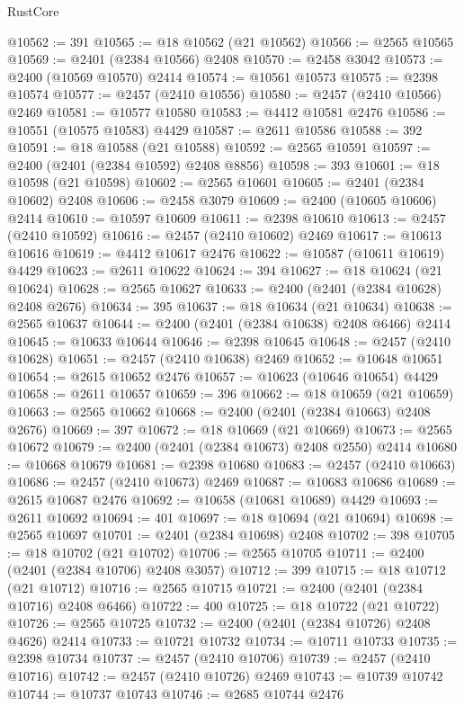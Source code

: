 \begin{lexlean}{RustCore}
\begin{coremodule}
@10562 := 391
@10565 := @18 @10562 (@21 @10562)
@10566 := @2565 @10565
@10569 := @2401 (@2384 @10566) @2408
@10570 := @2458 @3042
@10573 := @2400 (@10569 @10570) @2414
@10574 := @10561 @10573
@10575 := @2398 @10574
@10577 := @2457 (@2410 @10556)
@10580 := @2457 (@2410 @10566) @2469
@10581 := @10577 @10580
@10583 := @4412 @10581 @2476
@10586 := @10551 (@10575 @10583) @4429
@10587 := @2611 @10586
@10588 := 392
@10591 := @18 @10588 (@21 @10588)
@10592 := @2565 @10591
@10597 := @2400 (@2401 (@2384 @10592) @2408 @8856)
@10598 := 393
@10601 := @18 @10598 (@21 @10598)
@10602 := @2565 @10601
@10605 := @2401 (@2384 @10602) @2408
@10606 := @2458 @3079
@10609 := @2400 (@10605 @10606) @2414
@10610 := @10597 @10609
@10611 := @2398 @10610
@10613 := @2457 (@2410 @10592)
@10616 := @2457 (@2410 @10602) @2469
@10617 := @10613 @10616
@10619 := @4412 @10617 @2476
@10622 := @10587 (@10611 @10619) @4429
@10623 := @2611 @10622
@10624 := 394
@10627 := @18 @10624 (@21 @10624)
@10628 := @2565 @10627
@10633 := @2400 (@2401 (@2384 @10628) @2408 @2676)
@10634 := 395
@10637 := @18 @10634 (@21 @10634)
@10638 := @2565 @10637
@10644 := @2400 (@2401 (@2384 @10638) @2408 @6466) @2414
@10645 := @10633 @10644
@10646 := @2398 @10645
@10648 := @2457 (@2410 @10628)
@10651 := @2457 (@2410 @10638) @2469
@10652 := @10648 @10651
@10654 := @2615 @10652 @2476
@10657 := @10623 (@10646 @10654) @4429
@10658 := @2611 @10657
@10659 := 396
@10662 := @18 @10659 (@21 @10659)
@10663 := @2565 @10662
@10668 := @2400 (@2401 (@2384 @10663) @2408 @2676)
@10669 := 397
@10672 := @18 @10669 (@21 @10669)
@10673 := @2565 @10672
@10679 := @2400 (@2401 (@2384 @10673) @2408 @2550) @2414
@10680 := @10668 @10679
@10681 := @2398 @10680
@10683 := @2457 (@2410 @10663)
@10686 := @2457 (@2410 @10673) @2469
@10687 := @10683 @10686
@10689 := @2615 @10687 @2476
@10692 := @10658 (@10681 @10689) @4429
@10693 := @2611 @10692
@10694 := 401
@10697 := @18 @10694 (@21 @10694)
@10698 := @2565 @10697
@10701 := @2401 (@2384 @10698) @2408
@10702 := 398
@10705 := @18 @10702 (@21 @10702)
@10706 := @2565 @10705
@10711 := @2400 (@2401 (@2384 @10706) @2408 @3057)
@10712 := 399
@10715 := @18 @10712 (@21 @10712)
@10716 := @2565 @10715
@10721 := @2400 (@2401 (@2384 @10716) @2408 @6466)
@10722 := 400
@10725 := @18 @10722 (@21 @10722)
@10726 := @2565 @10725
@10732 := @2400 (@2401 (@2384 @10726) @2408 @4626) @2414
@10733 := @10721 @10732
@10734 := @10711 @10733
@10735 := @2398 @10734
@10737 := @2457 (@2410 @10706)
@10739 := @2457 (@2410 @10716)
@10742 := @2457 (@2410 @10726) @2469
@10743 := @10739 @10742
@10744 := @10737 @10743
@10746 := @2685 @10744 @2476

\end{coremodule}
\end{lexlean}
